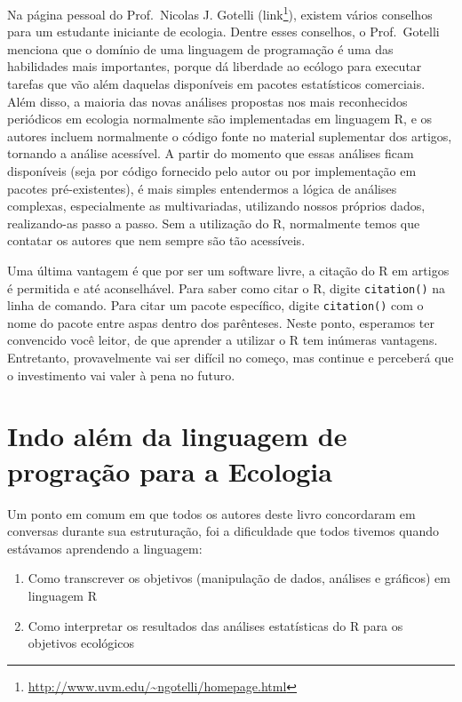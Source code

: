 \documentclass[
]{book}
\providecommand{\tightlist}{%
  \setlength{\itemsep}{0pt}\setlength{\parskip}{0pt}}
\renewenvironment{quote}{\begin{VF}}{\end{VF}}
\renewcommand{\href}[2]{#2\footnote{\url{#1}}}
\begin{document}
Na página pessoal do Prof.~Nicolas J. Gotelli (\href{http://www.uvm.edu/~ngotelli/homepage.html}{link}), existem vários conselhos para um estudante iniciante de ecologia. Dentre esses conselhos, o Prof.~Gotelli menciona que o domínio de uma linguagem de programação é uma das habilidades mais importantes, porque dá liberdade ao ecólogo para executar tarefas que vão além daquelas disponíveis em pacotes estatísticos comerciais. Além disso, a maioria das novas análises propostas nos mais reconhecidos periódicos em ecologia normalmente são implementadas em linguagem R, e os autores incluem normalmente o código fonte no material suplementar dos artigos, tornando a análise acessível. A partir do momento que essas análises ficam disponíveis (seja por código fornecido pelo autor ou por implementação em pacotes pré-existentes), é mais simples entendermos a lógica de análises complexas, especialmente as multivariadas, utilizando nossos próprios dados, realizando-as passo a passo. Sem a utilização do R, normalmente temos que contatar os autores que nem sempre são tão acessíveis.

Uma última vantagem é que por ser um software livre, a citação do R em artigos é permitida e até aconselhável. Para saber como citar o R, digite \texttt{citation()} na linha de comando. Para citar um pacote específico, digite \texttt{citation()} com o nome do pacote entre aspas dentro dos parênteses. Neste ponto, esperamos ter convencido você leitor, de que aprender a utilizar o R tem inúmeras vantagens. Entretanto, provavelmente vai ser difícil no começo, mas continue e perceberá que o investimento vai valer à pena no futuro.

\hypertarget{indo-aluxe9m-da-linguagem-de-prograuxe7uxe3o-para-a-ecologia}{%
\section{Indo além da linguagem de progração para a Ecologia}\label{indo-aluxe9m-da-linguagem-de-prograuxe7uxe3o-para-a-ecologia}}

Um ponto em comum em que todos os autores deste livro concordaram em conversas durante sua estruturação, foi a dificuldade que todos tivemos quando estávamos aprendendo a linguagem:

\begin{quote}
\begin{enumerate}
\def\labelenumi{\arabic{enumi}.}
\tightlist
\item
  Como transcrever os objetivos (manipulação de dados, análises e gráficos) em linguagem R
\item
  Como interpretar os resultados das análises estatísticas do R para os objetivos ecológicos
\end{enumerate}
\end{quote}
\end{document}
